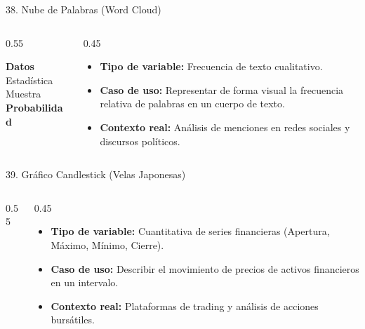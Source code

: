 \documentclass[aspectratio=169,10pt]{beamer}
\begin{document}
\begin{frame}{38. Nube de Palabras (Word Cloud)}
\begin{columns}
\begin{column}{0.55\textwidth}
\begin{center}
{\Huge \textbf{Datos}} {\large Estadística} \\[0.2cm]
{\small Muestra} {\Huge \textbf{Probabilidad}}
\end{center}
\end{column}
\begin{column}{0.45\textwidth}
\begin{itemize}\small
\item \textbf{Tipo de variable:} Frecuencia de texto cualitativo.
\item \textbf{Caso de uso:} Representar de forma visual la frecuencia relativa de palabras en un cuerpo de texto.
\item \textbf{Contexto real:} Análisis de menciones en redes sociales y discursos políticos.
\end{itemize}
\end{column}
\end{columns}
\end{frame}

\begin{frame}{39. Gráfico Candlestick (Velas Japonesas)}
\begin{columns}
\begin{column}{0.55\textwidth}
\end{column}
\begin{column}{0.45\textwidth}
\begin{itemize}\small
\item \textbf{Tipo de variable:} Cuantitativa de series financieras (Apertura, Máximo, Mínimo, Cierre).
\item \textbf{Caso de uso:} Describir el movimiento de precios de activos financieros en un intervalo.
\item \textbf{Contexto real:} Plataformas de trading y análisis de acciones bursátiles.
\end{itemize}
\end{column}
\end{columns}
\end{frame}
\end{document}
